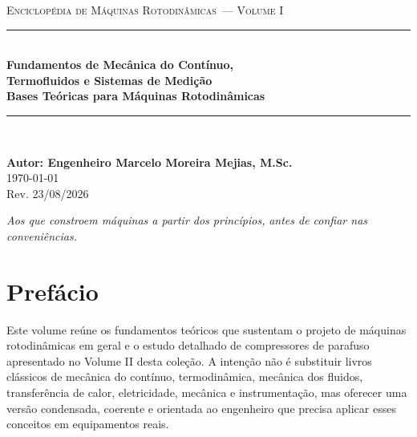 \documentclass[12pt,a4paper]{article}
\numberwithin{equation}{section}
\numberwithin{table}{section}
\numberwithin{figure}{section}
\newcommand{\colecaotitulo}{Enciclopédia de Máquinas Rotodinâmicas}
\newcommand{\volumeatual}{Volume I}
\newcommand{\revdata}{Rev. 23/08/2026}
\begin{document}
	\begin{titlepage}
		\centering
		\vspace*{1.5cm}
		{\large \textsc{\colecaotitulo\ --- \volumeatual}} \\[1cm]
		\rule{\textwidth}{0.4pt} \\[0.8cm]
		{\Huge \textbf{Fundamentos de Mecânica do Contínuo,}} \\[0.3cm]
		{\Huge \textbf{Termofluidos e Sistemas de Medição}} \\[0.5cm]
		{\Large \textbf{Bases Teóricas para Máquinas Rotodinâmicas}} \\[0.8cm]
		\rule{\textwidth}{0.4pt} \\[1.5cm]

		\vspace{5cm}

		\vfill
		{\large \textbf{Autor: Engenheiro Marcelo Moreira Mejias, M.Sc.}} \\[0.5cm]

		{\large \today} \\[0.3cm]
		{\normalsize \revdata}
	\end{titlepage}

	\newpage
	\thispagestyle{empty}
	\vspace*{\fill}
	\begin{flushright}
		\textit{Aos que constroem máquinas a partir dos princípios,}
		\textit{antes de confiar nas conveniências.}
	\end{flushright}
	\vspace*{\fill}


	\newpage
	\tableofcontents
	\newpage


\newpage
\section*{Prefácio}

Este volume reúne os fundamentos teóricos que sustentam o projeto de máquinas
rotodinâmicas em geral e o estudo detalhado de compressores de parafuso
apresentado no Volume II desta coleção. A intenção não é substituir livros
clássicos de mecânica do contínuo, termodinâmica, mecânica dos fluidos,
transferência de calor, eletricidade, mecânica e instrumentação, mas oferecer
uma versão condensada, coerente e orientada ao engenheiro que precisa aplicar
esses conceitos em equipamentos reais.
\end{document}
